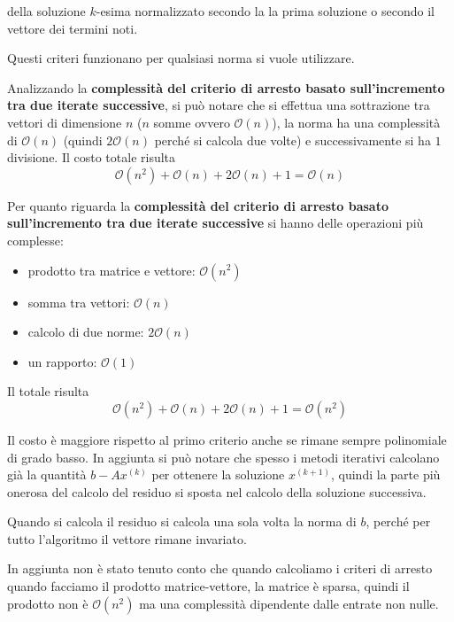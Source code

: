  della soluzione $k$-esima
normalizzato secondo la la prima soluzione o secondo il vettore dei termini noti.

\begin{nota}
    Questi criteri funzionano per qualsiasi norma si vuole utilizzare.
\end{nota}

Analizzando la \textbf{complessità del criterio di arresto basato sull'incremento tra due 
iterate successive}, si può notare che si effettua una sottrazione tra vettori 
di dimensione $n$ ($n$ somme ovvero $\mathcal{O}(n)$), la norma ha una complessità
di $\mathcal{O}(n)$ (quindi $2\mathcal{O}(n)$ perché si calcola due volte) e 
successivamente si ha $1$ divisione.
Il costo totale risulta
$$\mathcal{O}(n^2)+ \mathcal{O}(n)+2\mathcal{O}(n)+1 = \mathcal{O}(n)$$

Per quanto riguarda la \textbf{complessità del criterio di arresto basato sull'incremento tra due 
iterate successive} si hanno delle operazioni più complesse:
\begin{itemize}
    \item prodotto tra matrice e vettore: $\mathcal{O}(n^2)$
    \item somma tra vettori: $\mathcal{O}(n)$
    \item calcolo di due norme: $2\mathcal{O}(n)$
    \item un rapporto: $\mathcal{O}(1)$
\end{itemize}
Il totale risulta 
$$\mathcal{O}(n^2)+ \mathcal{O}(n)+2\mathcal{O}(n)+1 = \mathcal{O}(n^2)$$

Il costo è maggiore rispetto al primo criterio anche se rimane sempre polinomiale 
di grado basso. In aggiunta si può notare che spesso i metodi iterativi calcolano
già la quantità $b-Ax^{(k)}$ per ottenere la soluzione $x^{(k+1)}$, quindi la parte 
più onerosa del calcolo del residuo si sposta nel calcolo della soluzione successiva.

\begin{nota}
    Quando si calcola il residuo si calcola una sola volta la norma di $b$, perché
    per tutto l'algoritmo il vettore rimane invariato.
\end{nota}

\begin{nota}
    In aggiunta non è stato tenuto conto che quando calcoliamo i criteri di arresto
    quando facciamo il prodotto matrice-vettore, la matrice è sparsa, quindi 
    il prodotto non è $\mathcal{O}(n^2)$ ma una complessità dipendente dalle entrate 
    non nulle.
\end{nota}

